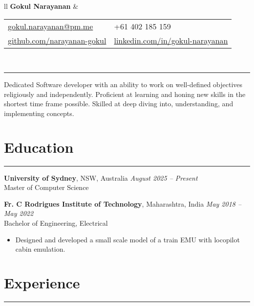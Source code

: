 \documentclass[11pt]{article}
\begin{document}
\begin{tabularx}{\textwidth}{ll}
	{\LARGE \textbf{Gokul Narayanan}} &

	\begin{tabular}{@{}ll}
		\href{mailto:gokul.narayanan@pm.me}{gokul.narayanan@pm.me} & +61 402 185 159 \\
		\href{https://github.com/narayanan-gokul}{github.com/narayanan-gokul} &
	\href{https://www.linkedin.com/in/gokul-narayanan-5a7681210/}{linkedin.com/in/gokul-narayanan} \\
	\end{tabular} \\

\end{tabularx}

\vspace{0.5em}
\rule{\textwidth}{2pt}

Dedicated Software developer with an ability to work on well-defined objectives
religiously and independently. Proficient at learning and honing new skills in
the shortest time frame possible. Skilled at deep diving into, understanding,
and implementing concepts.

\vspace{-0.5\baselineskip}
\section*{Education}
\hrule

\textbf{University of Sydney}, NSW, Australia \hfill \textit{August 2025 -- Present} \\
Master of Computer Science \\

\vspace{-1\baselineskip}

\textbf{Fr. C Rodrigues Institute of Technology}, Maharashtra, India
\hfill \textit{May 2018 -- May 2022} \\
Bachelor of Engineering, Electrical \\
\vspace{-1.5\baselineskip}
\begin{itemize}[topsep=0pt, itemsep=0pt, partopsep=0pt, label=--]
	\item Designed and developed a small scale model of a train EMU with
		locopilot cabin emulation.
\end{itemize}

\vspace{-0.5\baselineskip}
\section*{Experience}
\hrule
\end{document}
